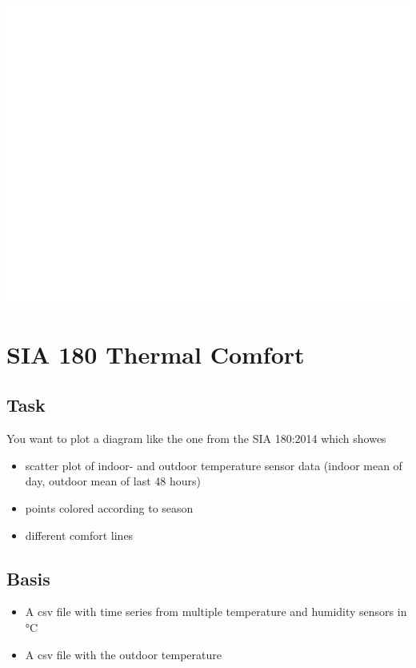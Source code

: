 \documentclass[
]{book}
\begin{document}
\includegraphics{edar_files/figure-latex/mollier hx-1.pdf}

\hypertarget{sia-180-thermal-comfort}{%
\section{SIA 180 Thermal Comfort}\label{sia-180-thermal-comfort}}

\hypertarget{task-2}{%
\subsection{Task}\label{task-2}}

You want to plot a diagram like the one from the SIA 180:2014 which showes

\begin{itemize}
\item
  scatter plot of indoor- and outdoor temperature sensor data (indoor mean of day, outdoor mean of last 48 hours)
\item
  points colored according to season
\item
  different comfort lines
\end{itemize}

\hypertarget{basis-3}{%
\subsection{Basis}\label{basis-3}}

\begin{itemize}
\item
  A csv file with time series from multiple temperature and humidity sensors in °C
\item
  A csv file with the outdoor temperature
\end{itemize}
\end{document}
